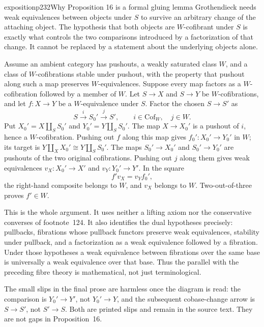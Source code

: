 \begin{dcomment}{exposition}{p232}{Why Proposition 16 is a formal gluing lemma}
Grothendieck needs weak equivalences between objects under $S$ to survive an arbitrary change of the attaching object. The hypothesis that both objects are $W$-cofibrant under $S$ is exactly what controls the two comparisons introduced by a factorization of that change. It cannot be replaced by a statement about the underlying objects alone.

Assume an ambient category has pushouts, a weakly saturated class $W$, and a class of $W$-cofibrations stable under pushout, with the property that pushout along such a map preserves $W$-equivalences. Suppose every map factors as a $W$-cofibration followed by a member of $W$. Let $S\to X$ and $S\to Y$ be $W$-cofibrations, and let $f:X\to Y$ be a $W$-equivalence under $S$. Factor the chosen $S\to S'$ as
\[
 S\xrightarrow{i}S_0'\xrightarrow{j}S',\qquad i\in\mathrm{Cof}_W,\quad j\in W.
\]
Put $X_0'=X\amalg_SS_0'$ and $Y_0'=Y\amalg_SS_0'$. The map $X\to X_0'$ is a pushout of $i$, hence a $W$-cofibration. Pushing out $f$ along this map gives $f_0':X_0'\to Y_0'$ in $W$; its target is $Y\amalg_X X_0'\cong Y\amalg_SS_0'$. The maps $S_0'\to X_0'$ and $S_0'\to Y_0'$ are pushouts of the two original cofibrations. Pushing out $j$ along them gives weak equivalences $v_X:X_0'\to X'$ and $v_Y:Y_0'\to Y'$. In the square
\[
 f'v_X=v_Yf_0',
\]
the right-hand composite belongs to $W$, and $v_X$ belongs to $W$. Two-out-of-three proves $f'\in W$.

This is the whole argument. It uses neither a lifting axiom nor the conservative converses of footnote~124. It also identifies the dual hypotheses precisely: pullbacks, fibrations whose pullback functors preserve weak equivalences, stability under pullback, and a factorization as a weak equivalence followed by a fibration. Under those hypotheses a weak equivalence between fibrations over the same base is universally a weak equivalence over that base. Thus the parallel with the preceding fibre theory is mathematical, not just terminological.

The small slips in the final prose are harmless once the diagram is read: the comparison is $Y_0'\to Y'$, not $Y_0'\to Y$, and the subsequent cobase-change arrow is $S\to S'$, not $S'\to S$. Both are printed slips and remain in the source text. They are not gaps in Proposition~16.
\end{dcomment}

